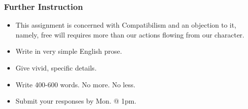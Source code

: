 \documentclass[]{article}
\begin{document}
\subsubsection{Further Instruction}\label{further-instruction}

\begin{itemize}
\itemsep1pt\parskip0pt
\item
  This assignment is concerned with Compatibilism and an objection to
  it, namely, free will requires more than our actions flowing from our
  character.
\item
  Write in very simple English prose.
\item
  Give vivid, specific details.
\item
  Write 400-600 words. No more. No less.
\item
  Submit your responses by Mon. @ 1pm.
\end{itemize}
\end{document}
